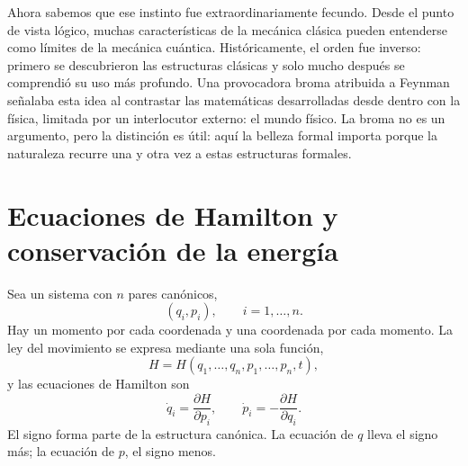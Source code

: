 Ahora sabemos que ese instinto fue extraordinariamente fecundo. Desde el punto de vista lógico, muchas características de la mecánica clásica pueden entenderse como límites de la mecánica cuántica. Históricamente, el orden fue inverso: primero se descubrieron las estructuras clásicas y solo mucho después se comprendió su uso más profundo. Una provocadora broma atribuida a Feynman señalaba esta idea al contrastar las matemáticas desarrolladas desde dentro con la física, limitada por un interlocutor externo: el mundo físico. La broma no es un argumento, pero la distinción es útil: aquí la belleza formal importa porque la naturaleza recurre una y otra vez a estas estructuras formales.

\begin{classroomqa}
\end{classroomqa}

\section{Ecuaciones de Hamilton y conservación de la energía}

Sea un sistema con \(n\) pares canónicos,
\begin{equation}
  (q_i,p_i),\qquad i=1,\ldots,n.
  \label{eq:l7-canonical-pairs}
\end{equation}
Hay un momento por cada coordenada y una coordenada por cada momento. La ley del movimiento se expresa mediante una sola función,
\begin{equation}
  H=H(q_1,\ldots,q_n,p_1,\ldots,p_n,t),
  \label{eq:l7-hamiltonian}
\end{equation}
y las ecuaciones de Hamilton son
\begin{equation}
  \boxed{
  \dot q_i=\frac{\partial H}{\partial p_i},
  \qquad
  \dot p_i=-\frac{\partial H}{\partial q_i}.}
  \label{eq:l7-hamilton-equations}
\end{equation}
El signo forma parte de la estructura canónica. La ecuación de \(q\) lleva el signo más; la ecuación de \(p\), el signo menos.

